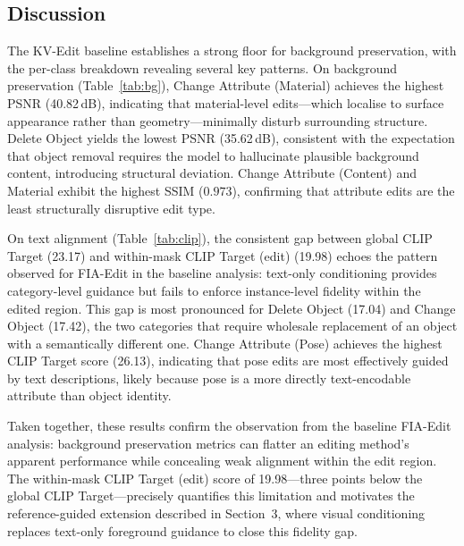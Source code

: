 \subsection{Discussion}

The KV-Edit baseline establishes a strong floor for background preservation, with the
per-class breakdown revealing several key patterns.
On background preservation (Table~\ref{tab:bg}), Change Attribute (Material) achieves
the highest PSNR (40.82\,dB), indicating that material-level edits—which localise to
surface appearance rather than geometry—minimally disturb surrounding structure.
Delete Object yields the lowest PSNR (35.62\,dB), consistent with the expectation
that object removal requires the model to hallucinate plausible background content,
introducing structural deviation.
Change Attribute (Content) and Material exhibit the highest SSIM ($0.973$), confirming
that attribute edits are the least structurally disruptive edit type.

On text alignment (Table~\ref{tab:clip}), the consistent gap between global CLIP Target
(23.17) and within-mask CLIP Target (edit) (19.98) echoes the pattern observed for
FIA-Edit in the baseline analysis: text-only conditioning provides category-level
guidance but fails to enforce instance-level fidelity within the edited region.
This gap is most pronounced for Delete Object (17.04) and Change Object (17.42),
the two categories that require wholesale replacement of an object with a semantically
different one.
Change Attribute (Pose) achieves the highest CLIP Target score (26.13), indicating that
pose edits are most effectively guided by text descriptions, likely because pose is
a more directly text-encodable attribute than object identity.

Taken together, these results confirm the observation from the baseline FIA-Edit
analysis: background preservation metrics can flatter an editing method's apparent
performance while concealing weak alignment within the edit region.
The within-mask CLIP Target (edit) score of 19.98—three points below the global CLIP
Target—precisely quantifies this limitation and motivates the reference-guided
extension described in Section~3, where visual conditioning replaces text-only
foreground guidance to close this fidelity gap.
